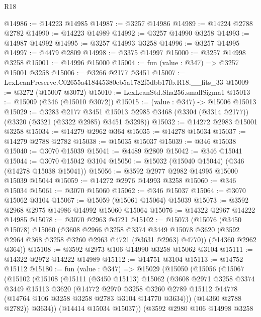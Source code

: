 \begin{lexlean}{R18}
\begin{coremodule}
@14986 := @14223 @14985
@14987 := @3257 @14986
@14989 := @14224 @2788 @2782
@14990 := @14223 @14989
@14992 := @3257 @14990 @3258
@14993 := @14987 @14992
@14995 := @3257 @14993 @3258
@14996 := @3257 @14995
@14997 := @4479 @2809
@14998 := @3375 @14997
@15000 := @3257 @14998 @3258
@15001 := @14996 @15000
@15004 := fun (value : @347) => @3257 @15001 @3258
@15006 := @3266 @2177 @3451
@15007 := LexLeanPreserve.C02655a418445380eb5a1782f5dbb17fb.R18.__fits_33
@15009 := @3272 (@15007 @3072)
@15010 := LexLeanStd.Sha256.smallSigma1
@15013 := @15009 (@346 (@15010 @3072))
@15015 := (value : @347) -> @15006 @15013
@15029 := @3283
    @2177
    @3451
    @15013
    @2985
    @3468
    (@3304 (@3314 @2177))
    (@3320 (@3321 (@3322 @2985) @3451 @3298))
@15032 := @14272 @2983 @15001 @3258
@15034 := @14279 @2962 @364
@15035 := @14278 @15034
@15037 := @14279 @2788 @2782
@15038 := @15035 @15037
@15039 := @346 @15038
@15040 := @3070 @15039
@15041 := @4489 @2809
@15042 := @346 @15041
@15044 := @3070 @15042 @3104
@15050 := @15032 (@15040 @15044) (@346 (@14278 @15038 @15041))
@15056 := @3592 @2977 @2982 @14995 @15000 @15039 @15044
@15059 := @14272 @2976 @14993 @3258
@15060 := @346 @15034
@15061 := @3070 @15060
@15062 := @346 @15037
@15064 := @3070 @15062 @3104
@15067 := @15059 (@15061 @15064) @15039
@15073 := @3592 @2968 @2975 @14986 @14992 @15060 @15064
@15076 := @14322 @2967 @14222 @14985
@15078 := @3070 @2963 @4721
@15102 := @15073
    (@15076
      (@3450 @15078)
      @15060
      (@3608
        @2966
        @3258
        @3374
        @3449
        @15078
        @3620
        (@3592 @2964 @368 @3258 @3260 @2963 @4721 (@3631 @2963) @4770))
      (@14360 @2962 @364))
@15108 := @3592 @2973 @106 @14990 @3258 @15062 @3104
@15111 := @14322 @2972 @14222 @14989
@15112 := @14751 @3104
@15113 := @14752 @15112
@15180 := fun (value : @347) =>
  @15029
    (@15050
      (@15056
        (@15067
          (@15102
            (@15108
              (@15111
                (@3450 @15113)
                @15062
                (@3608
                  @2971
                  @3258
                  @3374
                  @3449
                  @15113
                  @3620
                  (@14772
                    @2970
                    @3258
                    @3260
                    @2789
                    @15112
                    @14778
                    (@14764 @106 @3258 @3258 @2783 @3104 @14770 @3634)))
                (@14360 @2788 @2782))
              @3634))
          (@14414 @15034 @15037))
        (@3592
          @2980
          @106
          @14998
          @3258

\end{coremodule}
\end{lexlean}
